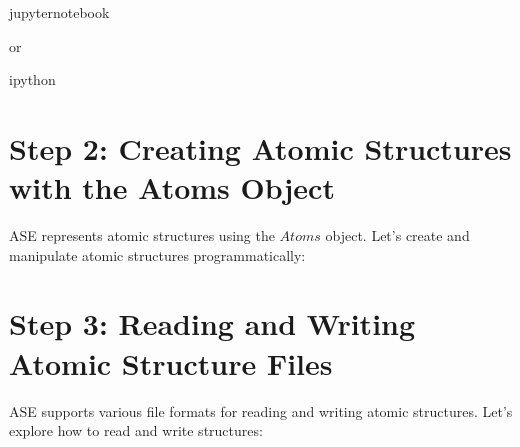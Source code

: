 \documentclass[letterpaper,10pt,english]{sphinxmanual}
\begin{document}
\begin{sphinxVerbatim}[commandchars=\\\{\}]
jupyternotebook
\end{sphinxVerbatim}

\sphinxAtStartPar
or

\begin{sphinxVerbatim}[commandchars=\\\{\}]
ipython
\end{sphinxVerbatim}


\section{Step 2: Creating Atomic Structures with the Atoms Object}
\label{\detokenize{asebasics/asebasics:step-2-creating-atomic-structures-with-the-atoms-object}}
\sphinxAtStartPar
ASE represents atomic structures using the \(Atoms\) object. Let’s create and manipulate atomic structures programmatically:

\begin{sphinxVerbatim}[commandchars=\\\{\}]
   

   \PYG{p}{[}\PYG{p}{[}  \PYG{p}{]} \PYG{p}{[}  \PYG{p}{]} \PYG{p}{[}  \PYG{p}{]}\PYG{p}{]}

\end{sphinxVerbatim}


\section{Step 3: Reading and Writing Atomic Structure Files}
\label{\detokenize{asebasics/asebasics:step-3-reading-and-writing-atomic-structure-files}}
\sphinxAtStartPar
ASE supports various file formats for reading and writing atomic structures. Let’s explore how to read and write structures:

\begin{sphinxVerbatim}[commandchars=\\\{\}]

   
  
\end{sphinxVerbatim}
\end{document}
